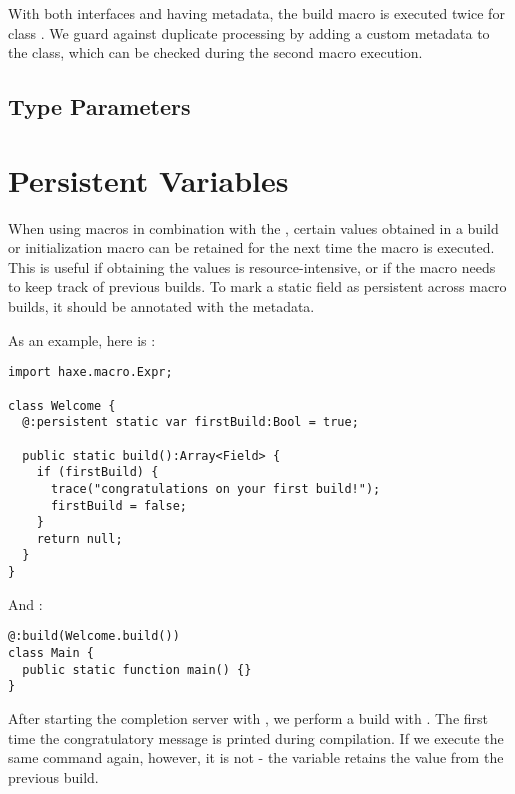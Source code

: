 
With both interfaces  and  having  metadata, the build macro is executed twice for class . We guard against duplicate processing by adding a custom  metadata to the class, which can be checked during the second macro execution.


\subsection{Type Parameters}
\label{macro-limitations-type-parameters}


\section{Persistent Variables}
\label{macro-persistent-variables}

When using macros in combination with the , certain values obtained in a build or initialization macro can be retained for the next time the macro is executed. This is useful if obtaining the values is resource-intensive, or if the macro needs to keep track of previous builds. To mark a static field as persistent across macro builds, it should be annotated with the  metadata.

As an example, here is :

\begin{lstlisting}
import haxe.macro.Expr;

class Welcome {
  @:persistent static var firstBuild:Bool = true;

  public static build():Array<Field> {
    if (firstBuild) {
      trace("congratulations on your first build!");
      firstBuild = false;
    }
    return null;
  }
}
\end{lstlisting}

And :

\begin{lstlisting}
@:build(Welcome.build())
class Main {
  public static function main() {}
}
\end{lstlisting}

After starting the completion server with , we perform a build with . The first time the congratulatory message is printed during compilation. If we execute the same command again, however, it is not - the  variable retains the value  from the previous build.



